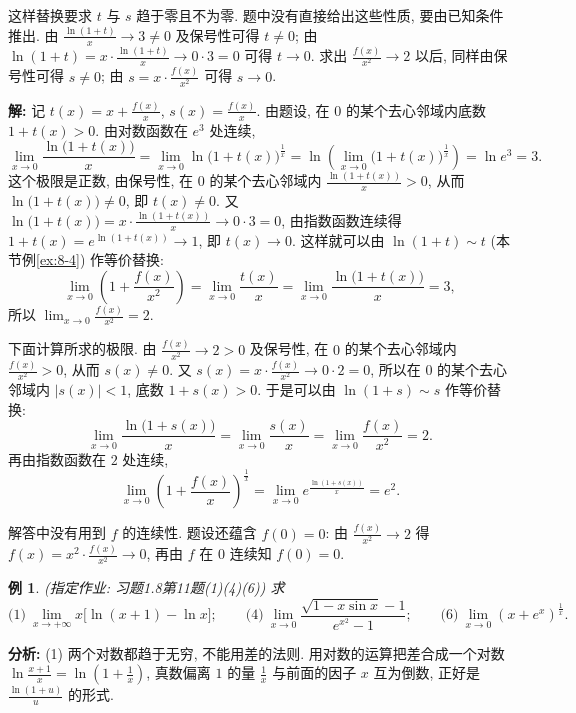 \documentclass[UTF8,openany]{ctexbook}
\theoremstyle{chinesetextbook}
\newtheorem{example}{例}[section]
\newenvironment{cnsolution}{\par\indent\textbf{解:} \ignorespaces}{\par}
\begin{document}
这样替换要求 $t$ 与 $s$ 趋于零且不为零. 题中没有直接给出这些性质, 要由已知条件推出. 由 $\displaystyle\frac{\ln(1+t)}x\to3\ne0$ 及保号性可得 $t\ne0$; 由 $\displaystyle\ln(1+t)=x\cdot\frac{\ln(1+t)}x\to0\cdot3=0$ 可得 $t\to0$. 求出 $\displaystyle\frac{f(x)}{x^2}\to2$ 以后, 同样由保号性可得 $s\ne0$; 由 $\displaystyle s=x\cdot\frac{f(x)}{x^2}$ 可得 $s\to0$.
\begin{cnsolution}
记 $\displaystyle t(x)=x+\frac{f(x)}x$, $\displaystyle s(x)=\frac{f(x)}x$. 由题设, 在 $0$ 的某个去心邻域内底数 $1+t(x)>0$. 由对数函数在 $e^3$ 处连续,
\[
\lim_{x\to0}\frac{\ln\bigl(1+t(x)\bigr)}x=\lim_{x\to0}\ln\bigl(1+t(x)\bigr)^{\frac1x}=\ln\left(\lim_{x\to0}\bigl(1+t(x)\bigr)^{\frac1x}\right)=\ln e^3=3.
\]
这个极限是正数, 由保号性, 在 $0$ 的某个去心邻域内 $\displaystyle\frac{\ln(1+t(x))}x>0$, 从而 $\ln\bigl(1+t(x)\bigr)\ne0$, 即 $t(x)\ne0$. 又 $\displaystyle\ln\bigl(1+t(x)\bigr)=x\cdot\frac{\ln(1+t(x))}x\to0\cdot3=0$, 由指数函数连续得 $1+t(x)=e^{\ln(1+t(x))}\to1$, 即 $t(x)\to0$. 这样就可以由 $\ln(1+t)\sim t$ (本节例\ref{ex:8-4}) 作等价替换:
\[
\lim_{x\to0}\left(1+\frac{f(x)}{x^2}\right)=\lim_{x\to0}\frac{t(x)}x=\lim_{x\to0}\frac{\ln\bigl(1+t(x)\bigr)}x=3,
\]
所以 $\displaystyle\lim_{x\to0}\frac{f(x)}{x^2}=2$.

下面计算所求的极限. 由 $\displaystyle\frac{f(x)}{x^2}\to2>0$ 及保号性, 在 $0$ 的某个去心邻域内 $\displaystyle\frac{f(x)}{x^2}>0$, 从而 $s(x)\ne0$. 又 $\displaystyle s(x)=x\cdot\frac{f(x)}{x^2}\to0\cdot2=0$, 所以在 $0$ 的某个去心邻域内 $|s(x)|<1$, 底数 $1+s(x)>0$. 于是可以由 $\ln(1+s)\sim s$ 作等价替换:
\[
\lim_{x\to0}\frac{\ln\bigl(1+s(x)\bigr)}x=\lim_{x\to0}\frac{s(x)}x=\lim_{x\to0}\frac{f(x)}{x^2}=2.
\]
再由指数函数在 $2$ 处连续,
\[
\lim_{x\to0}\left(1+\frac{f(x)}x\right)^{\frac1x}=\lim_{x\to0}e^{\frac{\ln(1+s(x))}x}=e^2.
\]
\end{cnsolution}
解答中没有用到 $f$ 的连续性. 题设还蕴含 $f(0)=0$: 由 $\displaystyle\frac{f(x)}{x^2}\to2$ 得 $\displaystyle f(x)=x^2\cdot\frac{f(x)}{x^2}\to0$, 再由 $f$ 在 $0$ 连续知 $f(0)=0$.
\begin{example}
\textnormal{(指定作业: 习题1.8第11题(1)(4)(6))} 求
\[
\text{(1)}\ \lim_{x\to+\infty}x\bigl[\ln(x+1)-\ln x\bigr];\qquad\text{(4)}\ \lim_{x\to0}\frac{\sqrt{1-x\sin x}-1}{e^{x^2}-1};\qquad\text{(6)}\ \lim_{x\to0}\left(x+e^x\right)^{\frac1x}.
\]
\end{example}
\par\indent\textbf{分析:} (1) 两个对数都趋于无穷, 不能用差的法则. 用对数的运算把差合成一个对数 $\displaystyle\ln\frac{x+1}x=\ln\left(1+\frac1x\right)$, 真数偏离 $1$ 的量 $\displaystyle\frac1x$ 与前面的因子 $x$ 互为倒数, 正好是 $\displaystyle\frac{\ln(1+u)}u$ 的形式.
\end{document}
